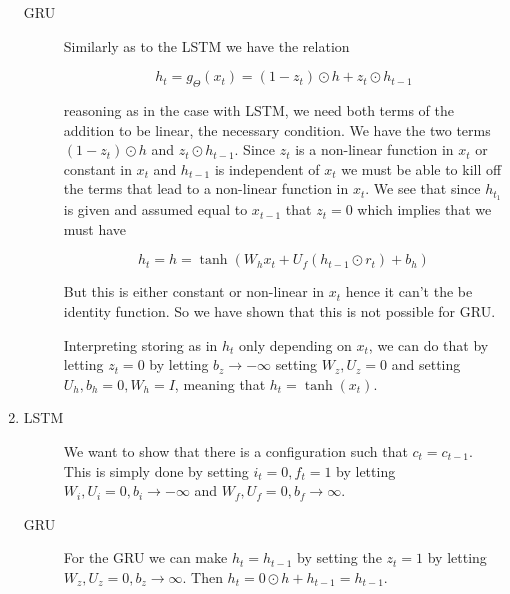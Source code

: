 \documentclass{article}
\begin{document}
\begin{enumerate}
\begin{description}
  \item[GRU] Similarly as to the LSTM we have the relation

    \begin{equation*}
      h_t = g_{\Theta}(x_t) = (1 - z_t) \odot h + z_t \odot h_{t-1}
    \end{equation*}

    reasoning as in the case with LSTM, we need both terms of the addition to be
    linear, the necessary condition. We have the two terms $(1 - z_t) \odot h$
    and $z_t \odot h_{t-1}$. Since $z_t$ is a non-linear function in $x_t$ or
    constant in $x_t$ and $h_{t-1}$ is independent of $x_t$ we must be able to
    kill off the terms that lead to a non-linear function in $x_t$. We see that
    since $h_{t_1}$ is given and assumed equal to $x_{t-1}$ that $z_t = 0$ which
    implies that we must have

    \begin{equation*}
      h_t = h = \tanh(W_h x_t + U_f (h_{t-1} \odot r_t) + b_h)
    \end{equation*}

    But this is either constant or non-linear in $x_t$ hence it can't the be
    identity function. So we have shown that this is not possible for GRU.

    Interpreting storing as in $h_t$ only depending on $x_t$, we can do that by
    letting $z_t = 0$ by letting $b_z \to -\infty$ setting $W_z, U_z = 0$ and
    setting $U_h, b_h = 0, W_h = I$, meaning that $h_t = \tanh(x_t)$. 
    
  \end{description}
  
\item

  \begin{description}
  \item[LSTM]

    We want to show that there is a configuration such that $c_t = c_{t - 1}$.
    This is simply done by setting $i_t = 0, f_t = 1$ by letting $W_i, U_i = 0,
    b_i \to -\infty$ and $W_f, U_f = 0, b_f \to \infty$.
    
  \item[GRU]

    For the GRU we can make $h_t = h_{t-1}$ by setting the $z_t = 1$ by letting
    $W_z, U_z = 0, b_z \to \infty$. Then $h_t = 0 \odot h + h_{t-1} = h_{t-1}$.
    
  \end{description}


\end{enumerate}
\end{document}
